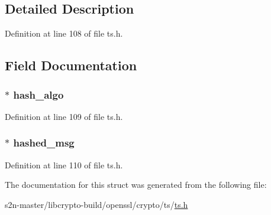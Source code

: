 \subsection{Detailed Description}


Definition at line 108 of file ts.\+h.



\subsection{Field Documentation}
\subsubsection[{\texorpdfstring{hash\+\_\+algo}{hash_algo}}]{ $\ast$ hash\+\_\+algo}\hypertarget{struct_t_s__msg__imprint__st_a2f5ec8cba655c24383a69218680e57c0}{}\label{struct_t_s__msg__imprint__st_a2f5ec8cba655c24383a69218680e57c0}


Definition at line 109 of file ts.\+h.

\subsubsection[{\texorpdfstring{hashed\+\_\+msg}{hashed_msg}}]{ $\ast$ hashed\+\_\+msg}\hypertarget{struct_t_s__msg__imprint__st_adb78af7d6c57b86482e3686d52c225fc}{}\label{struct_t_s__msg__imprint__st_adb78af7d6c57b86482e3686d52c225fc}


Definition at line 110 of file ts.\+h.



The documentation for this struct was generated from the following file\+:\begin{DoxyCompactItemize}
\item 
s2n-\/master/libcrypto-\/build/openssl/crypto/ts/\hyperlink{crypto_2ts_2ts_8h}{ts.\+h}\end{DoxyCompactItemize}
